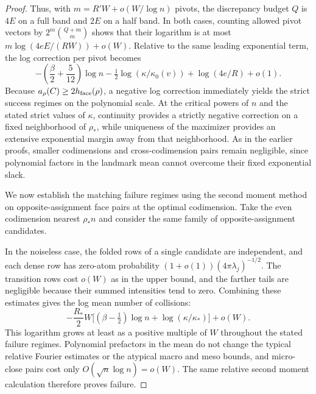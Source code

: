 \begin{proof}
Thus, with \(m=R'W+o(W/\log n)\) pivots, the discrepancy budget \(Q\) is \(4E\) on a full band and \(2E\) on a half band. In both cases, counting allowed pivot vectors by \(2^m\binom{Q+m}{m}\) shows that their logarithm is at most \(m\log(4eE/(RW))+o(W)\). Relative to the same leading exponential term, the log correction per pivot becomes
\[
 -\left(\frac\beta2+\frac5{12}\right)\log n
   -\tfrac12\log(\kappa/\kappa_0(v))
   +\log(4e/R)+o(1).
\]
Because \(a_\rho(C)\ge 2h_{\rm face}(\rho)\), a negative log correction immediately yields the strict success regimes on the polynomial scale. At the critical powers of \(n\) and the stated strict values of \(\kappa\), continuity provides a strictly negative correction on a fixed neighborhood of \(\rho_*\), while uniqueness of the maximizer provides an extensive exponential margin away from that neighborhood. As in the earlier proofs, smaller codimensions and cross-codimension pairs remain negligible, since polynomial factors in the landmark mean cannot overcome their fixed exponential slack.

We now establish the matching failure regimes using the second moment method on opposite-assignment face pairs at the optimal codimension. Take the even codimension nearest \(\rho_* n\) and consider the same family of opposite-assignment candidates.

In the noiseless case, the folded rows of a single candidate are independent, and each dense row has zero-atom probability \((1+o(1))(4\pi\lambda_j)^{-1/2}\). The transition rows cost \(o(W)\) as in the upper bound, and the farther tails are negligible because their summed intensities tend to zero. Combining these estimates gives the log mean number of collisions:
\[
 -\frac{R_*}{2}W\big[(\beta-\tfrac12)\log n+
                               \log(\kappa/\kappa_*)\big]+o(W).
\]
This logarithm grows at least as a positive multiple of \(W\) throughout the stated failure regimes. Polynomial prefactors in the mean do not change the typical relative Fourier estimates or the atypical macro and meso bounds, and micro-close pairs cost only \(O(\sqrt n\log n)=o(W)\). The same relative second moment calculation therefore proves failure.


\end{proof}
